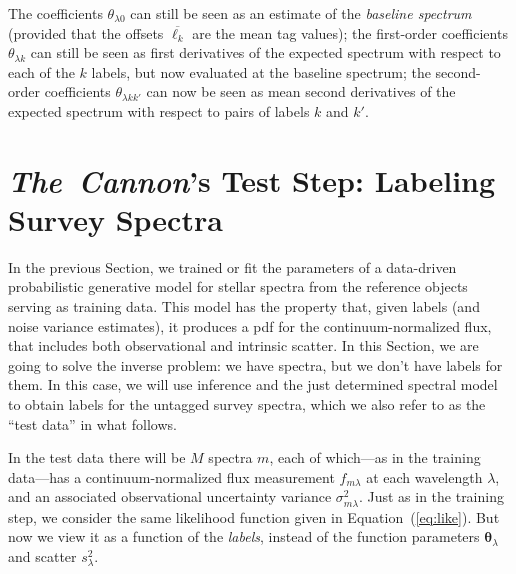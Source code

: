 \documentclass[12pt, preprint]{aastex}
\newcommand{\sectionname}{Section}
\newcommand{\tc}{\textsl{The~Cannon}}
\newcommand{\set}[1]{\bm{#1}}
\newcommand{\starlabel}{\ell}
\newcommand{\mean}[1]{\overline{#1}}
\begin{document}
The coefficients $\theta_{\lambda 0}$ can still be seen as an estimate of the
\emph{baseline spectrum} (provided that the offsets $\mean{\starlabel_k}$ are the
mean tag values); the first-order coefficients $\theta_{\lambda k}$ can still
be seen as first derivatives of the expected spectrum with respect to
each of the $k$ labels, but now evaluated at the baseline spectrum; the
second-order coefficients $\theta_{\lambda kk'}$ can now be seen as mean
second derivatives of the expected spectrum with respect to pairs of
labels $k$ and $k'$.

\section{\tc's Test Step: Labeling Survey Spectra}
\label{sec:paramestimate}

In the previous Section, we trained or fit the parameters of
a data-driven probabilistic generative model for stellar spectra from the reference objects
serving as training data.
This model has the property that, given labels (and noise variance estimates), it produces a
pdf for the continuum-normalized flux, that includes both observational and intrinsic
scatter.
In this \sectionname, we are going to solve the inverse problem:
we have spectra, but we don't have labels for them.
In this case, we will use inference and the just determined spectral model
to obtain labels for the untagged survey
spectra, which we also refer to as the ``test data'' in what follows. 

In the test data there will be $M$ spectra $m$, each of which---as in
the training data---has a continuum-normalized flux measurement
$f_{m\lambda}$ at each wavelength $\lambda$, and an
associated observational uncertainty variance $\sigma_{m\lambda}^2$.
Just as in the training step, we consider the same likelihood function given in
Equation~(\ref{eq:like}). But now we view it as a function of the \emph{labels},
instead of the function parameters $\set{\theta}_\lambda$ and
scatter $s_\lambda^2$.
\end{document}
